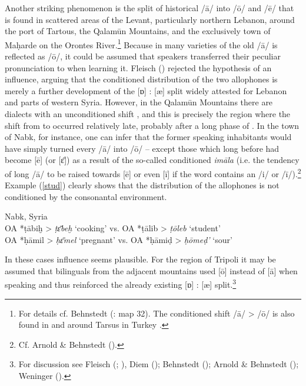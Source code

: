 \documentclass[output=paper]{langsci/langscibook}
\begin{document}
Another striking phenomenon is the split of historical /ā/ into /ō/ and /ē/ that is found in scattered areas of the Levant, particularly northern Lebanon, around the  port of Tartous, the Qalamūn Mountains, and the exclusively  town of Maḥarde on the Orontes River.\footnote{For details cf. Behnstedt (\citeyear{Behnstedt1997}: map 32). The conditioned shift /ā/ > /ō/ is also found in and around Tarsus in Turkey \citep[37--38]{Procházka2002Cukurova}.} Because in many varieties of  the old  /ā/ is reflected as /ō/, it could be assumed that  speakers transferred their peculiar pronunciation to  when learning it. Fleisch (\citeyear[49]{Fleisch1974vowels}) rejected the hypothesis of an  influence, arguing that the conditioned distribution of the two allophones is merely a further development of the [ɒ] : [æ] split widely attested for Lebanon and parts of western Syria. However, in the  Qalamūn Mountains there are dialects with an unconditioned shift \citep{Behnstedt1992}, and this is precisely the region where the shift from  to  occurred relatively late, probably after a long phase of . In the town of Nabk, for instance, one can infer that the former  speaking inhabitants would have simply turned every /ā/ into /ō/ – except those which long before had become [ē] (or [ɛ̄]) as a result of the so-called conditioned \textit{imāla} (i.e. the tendency of long /ā/ to be raised towards [ē] or even [ī] if the word contains an /i/ or /ī/).\footnote{Cf. Arnold \& Behnstedt (\citeyear[68]{ArnoldBehnstedt1993}).} Example (\ref{stud}) clearly shows that the distribution of the allophones is not conditioned by the consonantal environment.

\ea \label{stud}
{Nabk, Syria \citep[20]{Gralla2006}} \\
    \textup{OA} *ṭābiḫ > \textit{ṭɛ̄beḫ}  \textup{‘cooking’ vs. OA} *ṭālib > \textit{ṭōleb}  \textup{‘student’}\\
\textup{OA} *ḥāmil > \textit{ḥɛ̄mel} \textup{‘pregnant’ vs. OA} *ḥāmiḍ > \textit{ḥōmeḍ’} \textup{‘sour’}\\
\z

In these cases  influence seems plausible. For the region of Tripoli it may be assumed that  bilinguals from the adjacent mountains used [ō] instead of [ā] when speaking  and thus reinforced the already existing [ɒ] : [æ] split.\footnote{For discussion see Fleisch (\citeyear[48--50]{Fleisch1974vowels}; \citeyear[133--136]{Fleisch1974Kfar}), Diem (\citeyear[45--46]{Diem1979}); Behnstedt (\citeyear{Behnstedt1992}); Arnold \& Behnstedt (\citeyear[67--68]{ArnoldBehnstedt1993}); Weninger (\citeyear[748]{Weninger2011Aramaic}).}
\end{document}
